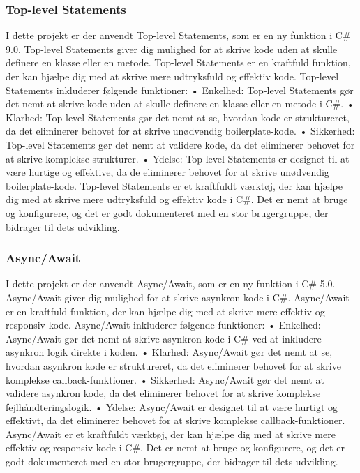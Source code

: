 \subsubsection{Top-level Statements}
I dette projekt er der anvendt Top-level Statements, som er en ny funktion i C\# 9.0. Top-level Statements giver dig mulighed for at skrive kode uden at skulle definere en klasse eller en metode. Top-level Statements er en kraftfuld funktion, der kan hjælpe dig med at skrive mere udtryksfuld og effektiv kode.
Top-level Statements inkluderer følgende funktioner:
•	Enkelhed: Top-level Statements gør det nemt at skrive kode uden at skulle definere en klasse eller en metode i C\#.
•	Klarhed: Top-level Statements gør det nemt at se, hvordan kode er struktureret, da det eliminerer behovet for at skrive unødvendig boilerplate-kode.
•	Sikkerhed: Top-level Statements gør det nemt at validere kode, da det eliminerer behovet for at skrive komplekse strukturer.
•	Ydelse: Top-level Statements er designet til at være hurtige og effektive, da de eliminerer behovet for at skrive unødvendig boilerplate-kode.
Top-level Statements er et kraftfuldt værktøj, der kan hjælpe dig med at skrive mere udtryksfuld og effektiv kode i C\#. Det er nemt at bruge og konfigurere, og det er godt dokumenteret med en stor brugergruppe, der bidrager til dets udvikling.

\subsubsection{Async/Await}
I dette projekt er der anvendt Async/Await, som er en ny funktion i C\# 5.0. Async/Await giver dig mulighed for at skrive asynkron kode i C\#. Async/Await er en kraftfuld funktion, der kan hjælpe dig med at skrive mere effektiv og responsiv kode.
Async/Await inkluderer følgende funktioner:
•	Enkelhed: Async/Await gør det nemt at skrive asynkron kode i C\# ved at inkludere asynkron logik direkte i koden.
•	Klarhed: Async/Await gør det nemt at se, hvordan asynkron kode er struktureret, da det eliminerer behovet for at skrive komplekse callback-funktioner.
•	Sikkerhed: Async/Await gør det nemt at validere asynkron kode, da det eliminerer behovet for at skrive komplekse fejlhåndteringslogik.
•	Ydelse: Async/Await er designet til at være hurtigt og effektivt, da det eliminerer behovet for at skrive komplekse callback-funktioner.
Async/Await er et kraftfuldt værktøj, der kan hjælpe dig med at skrive mere effektiv og responsiv kode i C\#. Det er nemt at bruge og konfigurere, og det er godt dokumenteret med en stor brugergruppe, der bidrager til dets udvikling.


